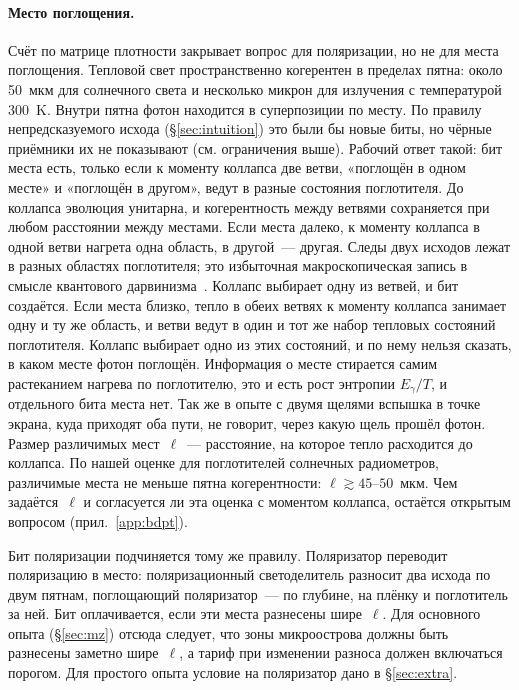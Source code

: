 \documentclass[11pt,a4paper]{article}
\newcommand{\Sref}[1]{\hyperref[#1]{\S\ref{#1}}}
\begin{document}
\paragraph{Место поглощения.}
Счёт по матрице плотности закрывает вопрос для поляризации, но не для места поглощения. Тепловой свет пространственно когерентен в пределах пятна: около 50~мкм для солнечного света и несколько микрон для излучения с температурой 300~K. Внутри пятна фотон находится в суперпозиции по месту. По правилу непредсказуемого исхода (\Sref{sec:intuition}) это были бы новые биты, но чёрные приёмники их не показывают (см. ограничения выше). Рабочий ответ такой: бит места есть, только если к моменту коллапса две ветви, «поглощён в одном месте» и «поглощён в другом», ведут в разные состояния поглотителя. До коллапса эволюция унитарна, и когерентность между ветвями сохраняется при любом расстоянии между местами. Если места далеко, к моменту коллапса в одной ветви нагрета одна область, в другой~--- другая. Следы двух исходов лежат в разных областях поглотителя; это избыточная макроскопическая запись в смысле квантового дарвинизма~\cite{zurek2009}. Коллапс выбирает одну из ветвей, и бит создаётся. Если места близко, тепло в обеих ветвях к моменту коллапса занимает одну и ту же область, и ветви ведут в один и тот же набор тепловых состояний поглотителя. Коллапс выбирает одно из этих состояний, и по нему нельзя сказать, в каком месте фотон поглощён. Информация о месте стирается самим растеканием нагрева по поглотителю, это и есть рост энтропии $E_\gamma/T$, и отдельного бита места нет. Так же в опыте с двумя щелями вспышка в точке экрана, куда приходят оба пути, не говорит, через какую щель прошёл фотон. Размер различимых мест~$\ell$~--- расстояние, на которое тепло расходится до коллапса. По нашей оценке для поглотителей солнечных радиометров, различимые места не меньше пятна когерентности: $\ell\gtrsim 45$--$50$~мкм. Чем задаётся~$\ell$ и согласуется ли эта оценка с моментом коллапса, остаётся открытым вопросом (прил.~\ref{app:bdpt}).

Бит поляризации подчиняется тому же правилу. Поляризатор переводит поляризацию в место: поляризационный светоделитель разносит два исхода по двум пятнам, поглощающий поляризатор~--- по глубине, на плёнку и поглотитель за ней. Бит оплачивается, если эти места разнесены шире~$\ell$. Для основного опыта (\Sref{sec:mz}) отсюда следует, что зоны микроострова должны быть разнесены заметно шире~$\ell$, а тариф при изменении разноса должен включаться порогом. Для простого опыта условие на поляризатор дано в \Sref{sec:extra}.
\end{document}
